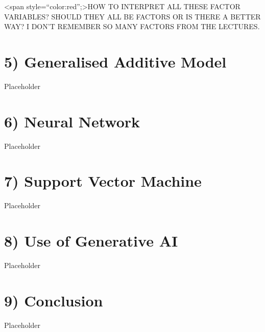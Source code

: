 \documentclass[
]{article}
\begin{document}
\textless span style=``color:red'';\textgreater HOW TO INTERPRET ALL
THESE FACTOR VARIABLES? SHOULD THEY ALL BE FACTORS OR IS THERE A BETTER
WAY? I DON'T REMEMBER SO MANY FACTORS FROM THE LECTURES.

\section{5) Generalised Additive
Model}\label{generalised-additive-model}

Placeholder

\section{6) Neural Network}\label{neural-network}

Placeholder

\section{7) Support Vector Machine}\label{support-vector-machine}

Placeholder

\section{8) Use of Generative AI}\label{use-of-generative-ai}

Placeholder

\section{9) Conclusion}\label{conclusion}

Placeholder
\end{document}
